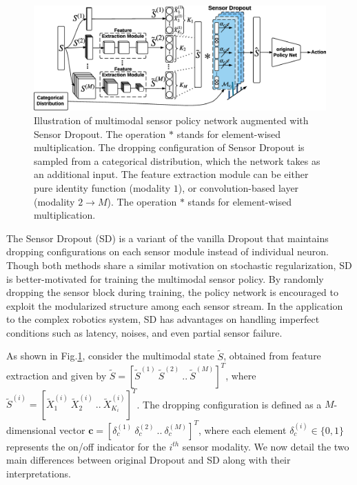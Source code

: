 \documentclass[../thesis.tex]{subfiles}
\begin{document}
\begin{figure}[t]
    	\begin{center}
\centerline{\includegraphics[width=0.8\columnwidth]{./MultimodalDRL/fig/SD_new}} %
    	\caption{Illustration of multimodal sensor policy network augmented with Sensor Dropout. The operation $*$ stands for element-wised multiplication. The dropping configuration of Sensor Dropout is sampled from a categorical distribution, which the network takes as an additional input. The feature extraction module can be either pure identity function (modality $1$), or convolution-based layer (modality $2 \to M$). The operation $*$ stands for element-wised multiplication.}
    	\label{fig:Multi-SD}
    	\end{center}
\end{figure}
 
 
The Sensor Dropout (SD) is a variant of the vanilla Dropout \cite{dropout} that maintains dropping configurations on each sensor module instead of individual neuron. Though both methods share a similar motivation on stochastic regularization, SD is better-motivated for training the multimodal sensor policy. By randomly dropping the sensor block during training, the policy network is encouraged to exploit the modularized structure among each sensor stream. In the application to the complex robotics system, SD has advantages on handling imperfect conditions such as latency, noises, and even partial sensor failure.
 
 
As shown in Fig.\ref{fig:Multi-SD}, consider the multimodal state $\tilde{S}$, obtained from feature extraction and given by $\tilde{S}=[\tilde{S}^{(1)}~\tilde{S}^{(2)}~..~\tilde{S}^{(M)}]^T$, where $\tilde{S}^{(i)}= [\tilde{X}_1^{(i)}~\tilde{X}_2^{(i)}~..~\tilde{X}_{K_i}^{(i)}]^T$.
The dropping configuration is defined as a $M$-dimensional vector $\mathbf{c} = [\delta_{c}^{(1)}~\delta_{c}^{(2)}~..~\delta_{c}^{(M)}]^T$, where each element $\delta_{c}^{(i)} \in \{0,1\}$ represents the on/off indicator for the $i^{th}$ sensor modality. We now detail the two main differences between original Dropout and SD along with their interpretations.
 
\end{document}
